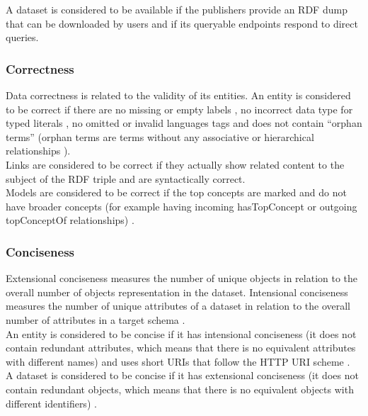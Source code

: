 \documentclass[onecolumn, crcready]{iosart2c}
\begin{document}
A dataset is considered to be available if the publishers provide an RDF dump that can be downloaded by users \cite{flemming2010}\cite{Hogan2010} and if its queryable endpoints respond to direct queries.

\subsubsection{Correctness}

Data correctness is related to the validity of its entities. An entity is considered to be correct if there are no missing or empty labels \cite{Acosta2013}\cite{Mader2012}, no incorrect data type for typed literals \cite{Hogan2010}\cite{Acosta2013}, no omitted or invalid languages tags \cite{Suominen:2012:IQS:2413941.2413985}\cite{Mader2012} and does not contain ``orphan terms'' (orphan terms are terms without any associative or hierarchical relationships \cite{journals/ires/Living10}).\\ Links are considered to be correct if they actually show related content to the subject of the RDF triple \cite{Suominen:2012:IQS:2413941.2413985}\cite{Acosta2013} and are syntactically correct. \\ Models are considered to be correct if the top concepts are marked and do not have broader concepts (for example having incoming hasTopConcept or outgoing topConceptOf relationships) \cite{Mader2012}.

\subsubsection{Conciseness}

Extensional conciseness measures the number of unique objects in relation to the overall number of objects representation in the dataset. Intensional conciseness measures the number of unique attributes of a dataset in relation to the overall number of attributes in a target schema \cite{ Bleiholder:2009}. \\ An entity is considered to be concise if it has intensional conciseness (it does not contain redundant attributes, which means that there is no equivalent attributes with different names) \cite{Mendes2012} and uses short URIs \cite{Framework2012} that follow the HTTP URI scheme \cite{Hogan:2012:ESL:2263498.2264570}\cite{Suominen2013}.\\ A dataset is considered to be concise if it has extensional conciseness (it does not contain redundant objects, which means that there is no equivalent objects with different identifiers) \cite{Mendes2012}.
\end{document}
